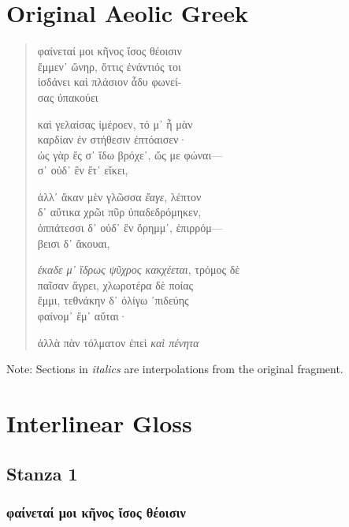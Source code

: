\section*{Original Aeolic Greek}
\begin{verse}
  φαίνεταί μοι κῆνος ἴσος θέοισιν \\
  ἔμμεν᾽ ὤνηρ, ὄττις ἐνάντιός τοι \\
  ἰσδάνει καὶ πλάσιον ἆδυ φωνεί-  \\
  σας ὐπακούει \\
  \smallskip

  καὶ γελαίσας ἰμέροεν, τό μ᾽ ἦ μὰν \\
  καρδίαν ἐν στήθεσιν ἐπτόαισεν· \\
  ὠς γὰρ ἔς σ᾽ ἴδω βρόχε᾽, ὤς με φώναι--- \\
  σ᾽ οὐδ᾽ ἒν ἔτ᾽ εἴκει, \\
  \smallskip

  ἀλλ᾽ ἄκαν μὲν γλῶσσα \emph{ἔαγε}, λέπτον \\
  δ᾽ αὔτικα χρῶι πῦρ ὐπαδεδρόμηκεν, \\
  ὀππάτεσσι δ᾽ οὐδ᾽ ἒν ὄρημμ᾽, ἐπιρρόμ--- \\
  βεισι δ᾽ ἄκουαι, \\
  \smallskip

  \emph{έκαδε μ᾽ ἴδρως ψῦχρος κακχέεται}, τρόμος δὲ \\
  παῖσαν ἄγρει, χλωροτέρα δὲ ποίας \\
  ἔμμι, τεθνάκην δ᾽ ὀλίγω ᾽πιδεύης \\
  φαίνομ᾽ ἔμ᾽ αὔται· \\
  \smallskip

  ἀλλὰ πὰν τόλματον ἐπεὶ \emph{καὶ πένητα}
\end{verse}

\noindent
Note: Sections in \emph{italics} are interpolations from the original fragment.

\section*{Interlinear Gloss}

\subsection*{Stanza 1}
\subsubsection*{φαίνεταί μοι κῆνος ἴσος θέοισιν}

